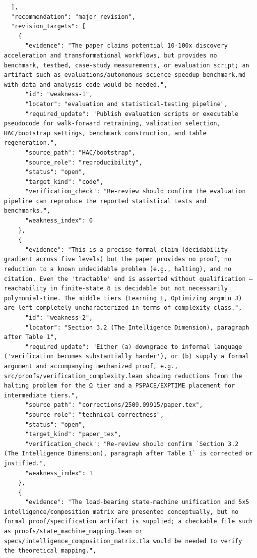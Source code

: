 \documentclass[11pt]{article}
\begin{document}
\begin{verbatim}
  ],
  "recommendation": "major_revision",
  "revision_targets": [
    {
      "evidence": "The paper claims potential 10-100x discovery acceleration and transformational workflows, but provides no benchmark, testbed, case-study measurements, or evaluation script; an artifact such as evaluations/autonomous_science_speedup_benchmark.md with data and analysis code would be needed.",
      "id": "weakness-1",
      "locator": "evaluation and statistical-testing pipeline",
      "required_update": "Publish evaluation scripts or executable pseudocode for walk-forward retraining, validation selection, HAC/bootstrap settings, benchmark construction, and table regeneration.",
      "source_path": "HAC/bootstrap",
      "source_role": "reproducibility",
      "status": "open",
      "target_kind": "code",
      "verification_check": "Re-review should confirm the evaluation pipeline can reproduce the reported statistical tests and benchmarks.",
      "weakness_index": 0
    },
    {
      "evidence": "This is a precise formal claim (decidability gradient across five levels) but the paper provides no proof, no reduction to a known undecidable problem (e.g., halting), and no citation. Even the 'tractable' end is asserted without qualification — reachability in finite-state δ is decidable but not necessarily polynomial-time. The middle tiers (Learning L, Optimizing argmin J) are left completely uncharacterized in terms of complexity class.",
      "id": "weakness-2",
      "locator": "Section 3.2 (The Intelligence Dimension), paragraph after Table 1",
      "required_update": "Either (a) downgrade to informal language ('verification becomes substantially harder'), or (b) supply a formal argument and accompanying mechanized proof, e.g., src/proofs/verification_complexity.lean showing reductions from the halting problem for the Ω tier and a PSPACE/EXPTIME placement for intermediate tiers.",
      "source_path": "corrections/2509.09915/paper.tex",
      "source_role": "technical_correctness",
      "status": "open",
      "target_kind": "paper_tex",
      "verification_check": "Re-review should confirm `Section 3.2 (The Intelligence Dimension), paragraph after Table 1` is corrected or justified.",
      "weakness_index": 1
    },
    {
      "evidence": "The load-bearing state-machine unification and 5x5 intelligence/composition matrix are presented conceptually, but no formal proof/specification artifact is supplied; a checkable file such as proofs/state_machine_mapping.lean or specs/intelligence_composition_matrix.tla would be needed to verify the theoretical mapping.",

\end{verbatim}
\end{document}
